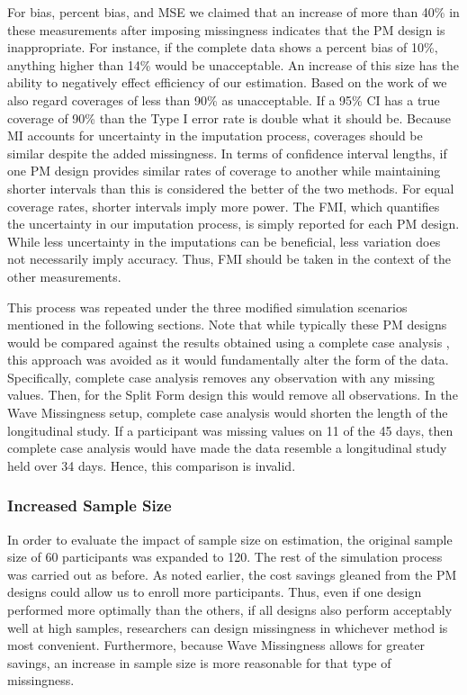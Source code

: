 \documentclass{svjour3}                     %
\begin{document}
For bias, percent bias, and MSE we claimed that an increase of more than 40\% in these measurements after imposing missingness indicates that the PM design is inappropriate. For instance, if the complete data shows a percent bias of 10\%, anything higher than 14\% would be unacceptable. An increase of this size has the ability to negatively effect efficiency of our estimation. Based on the work of \citet{collins2001comparison} we also regard coverages of less than 90\% as unacceptable. If a 95\% CI has a true coverage of 90\% than the Type I error rate is double what it should be. Because MI accounts for uncertainty in the imputation process, coverages should be similar despite the added missingness. In terms of confidence interval lengths, if one PM design provides similar rates of coverage to another while maintaining shorter intervals than this is considered the better of the two methods. For equal coverage rates, shorter intervals imply more power. The FMI, which quantifies the uncertainty in our imputation process, is simply reported for each PM design. While less uncertainty in the imputations can be beneficial, less variation does not necessarily imply accuracy. Thus, FMI should be taken in the context of the other measurements. \par

This process was repeated under the three modified simulation scenarios mentioned in the following sections. Note that while typically these PM designs would be compared against the results obtained using a complete case analysis \citep{rhemtulla2016asymptotic}, this approach was avoided as it would fundamentally alter the form of the data. Specifically, complete case analysis removes any observation with any missing values. Then, for the Split Form design this would remove all observations. In the Wave Missingness setup, complete case analysis would shorten the length of the longitudinal study. If a participant was missing values on 11 of the 45 days, then complete case analysis would have made the data resemble a longitudinal study held over 34 days. Hence, this comparison is invalid. \par

\subsubsection{Increased Sample Size}
In order to evaluate the impact of sample size on estimation, the original sample size of 60 participants was expanded to 120. The rest of the simulation process was carried out as before. As noted earlier, the cost savings gleaned from the PM designs could allow us to enroll more participants. Thus, even if one design performed more optimally than the others, if all designs also perform acceptably well at high samples, researchers can design missingness in whichever method is most convenient. Furthermore, because Wave Missingness allows for greater savings, an increase in sample size is more reasonable for that type of missingness. \par
\end{document}
